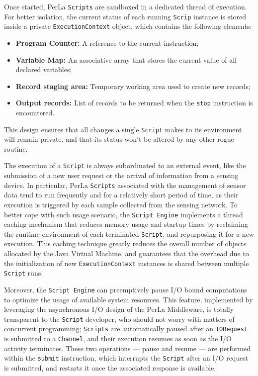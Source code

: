 Once started, PerLa \texttt{Scripts} are sandboxed in a dedicated thread of
execution. For better isolation, the current status of each running
\texttt{Scrip} instance is stored inside a private \texttt{ExecutionContext}
object, which contains the following elements:

\begin{itemize}

    \item \textbf{Program Counter:} A reference to the current instruction;

    \item \textbf{Variable Map:} An associative array that stores the current
        value of all declared variables;

    \item \textbf{Record staging area:} Temporary working area used to create
        new records;

    \item \textbf{Output records:} List of records to be returned when the
        \texttt{stop} instruction is encountered. 

\end{itemize}

This design ensures that all changes a single \texttt{Script} makes to its
environment will remain private, and that its status won't be altered by any
other rogue routine.

The execution of a \texttt{Script} is always subordinated to an external event,
like the submission of a new user request or the arrival of information from a
sensing device. In particular, PerLa \texttt{Scripts} associated with the
management of sensor data tend to run frequently and for a relatively short
period of time, as their execution is triggered by each sample collected from
the sensing network. To better cope with such usage scenario, the
\texttt{Script Engine} implements a thread caching mechanism that reduces
memory usage and startup times by reclaiming the runtime environment of each
terminated \texttt{Script}, and repurposing it for a new execution. This
caching technique greatly reduces the overall number of objects allocated by
the Java Virtual Machine, and guarantees that the overhead due to the
initialization of new \texttt{ExecutionContext} instances is shared between
multiple \texttt{Script} runs.

Moreover, the \texttt{Script Engine} can preemptively pause I/O bound
computations to optimize the usage of available system resources. This feature,
implemented by leveraging the asynchronous I/O design of the PerLa Middleware,
is totally transparent to the \texttt{Script} developer, who should not worry
with matters of concurrent programming; \texttt{Scripts} are automatically
paused after an \texttt{IORequest} is submitted to a \texttt{Channel}, and
their execution resumes as soon as the I/O activity terminates. These
two operations --- pause and resume --- are performed within the
\texttt{submit} instruction, which interrupts the \texttt{Script} after
an I/O request is submitted, and restarts it once the associated response is
available.


